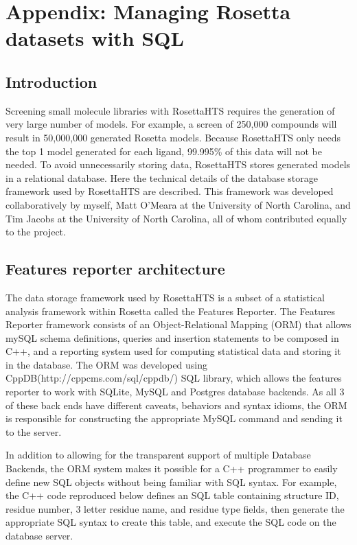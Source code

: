 \chapter{Appendix: Managing Rosetta datasets with SQL}

\section{Introduction}

Screening small molecule libraries with RosettaHTS requires the generation of very large number of models. 
For example, a screen of 250,000 compounds will result in 50,000,000 generated Rosetta models.
Because RosettaHTS only needs the top 1 model generated for each ligand, 99.995\% of this data will not be needed.
To avoid unnecessarily storing data, RosettaHTS stores generated models in a relational database.
Here  the technical details of the database storage framework used by RosettaHTS are described.
This framework was developed collaboratively by myself, Matt O'Meara at the University of North Carolina, and Tim Jacobs at the University of North Carolina, all of whom contributed equally to the project. 

\section{Features reporter architecture}

The data storage framework used by RosettaHTS is a subset of a statistical analysis framework within Rosetta called the Features Reporter.
The Features Reporter framework consists of an Object-Relational Mapping (ORM) that allows mySQL schema definitions, queries and insertion statements to be composed in C++, and a reporting system used for computing statistical data and storing it in the database.
The ORM was developed using CppDB(http://cppcms.com/sql/cppdb/) SQL library, which allows the features reporter to work with SQLite, MySQL and Postgres database backends.
As all 3 of these back ends have different caveats, behaviors and syntax idioms, the ORM is responsible for constructing the appropriate MySQL command and sending it to the server.

In addition to allowing for the transparent support of multiple Database Backends, the ORM system makes it possible for a C++ programmer to easily define new SQL objects without being familiar with SQL syntax. 
For example, the C++ code reproduced below defines an SQL table containing structure ID, residue number, 3 letter residue name, and residue type fields, then generate the appropriate SQL syntax to create this table, and execute the SQL code on the database server.

